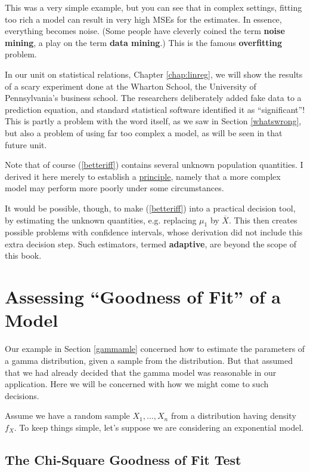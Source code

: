 This was a very simple example, but you can see that in complex
settings, fitting too rich a model can result in very high MSEs for the
estimates.  In essence, everything becomes noise.  (Some people have
cleverly coined the term {\bf noise mining}, a play on the term {\bf
data mining}.)  This is the famous {\bf overfitting} problem.

In our unit on statistical relations, Chapter \ref{chap:linreg}, we will show
the results of a scary experiment done at the Wharton School, the
University of Pennsylvania's business school.  The researchers
deliberately added fake data to a prediction equation, and standard
statistical software identified it as ``significant''!  This is partly a
problem with the word itself, as we saw in Section \ref{whatswrong}, but
also a problem of using far too complex a model, as will be seen in that
future unit.

Note that of course (\ref{betteriff}) contains several unknown
population quantities.  I derived it here merely to establish a
\underline{principle}, namely that a more complex model may perform more
poorly under some circumstances.

It would be possible, though, to make (\ref{betteriff}) into a practical
decision tool, by estimating the unknown quantities, e.g. replacing
$\mu_1$ by $\overline{X}$.  This then creates possible problems with
confidence intervals, whose derivation did not include this extra decision
step.  Such estimators, termed {\bf adaptive}, are beyond the scope of
this book.

\section{Assessing ``Goodness of Fit'' of a Model}
\label{gof}

Our example in Section \ref{gammamle} concerned how to estimate the
parameters of a gamma distribution, given a sample from the
distribution.  But that assumed that we had already decided that the
gamma model was reasonable in our application.  Here we will be
concerned with how we might come to such decisions.

Assume we have a random sample $X_1,...,X_n$ from a distribution having
density $f_X$.  To keep things simple, let's suppose we are considering
an exponential model.

\subsection{The Chi-Square Goodness of Fit Test}
\label{chisqgof}

